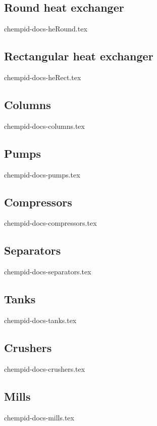 \documentclass[a4paper, twoside]{article}
\begin{document}
    \subsection{Round heat exchanger}
        {chempid-docs-heRound.tex}

    \subsection{Rectangular heat exchanger}
        {chempid-docs-heRect.tex}

    \subsection{Columns}
        {chempid-docs-columns.tex}

    \subsection{Pumps}
        {chempid-docs-pumps.tex}

    \subsection{Compressors}
        {chempid-docs-compressors.tex}

    \subsection{Separators}
        {chempid-docs-separators.tex}

    \subsection{Tanks}
        {chempid-docs-tanks.tex}

    \subsection{Crushers}
        {chempid-docs-crushers.tex}

    \subsection{Mills}
        {chempid-docs-mills.tex}
\end{document}
